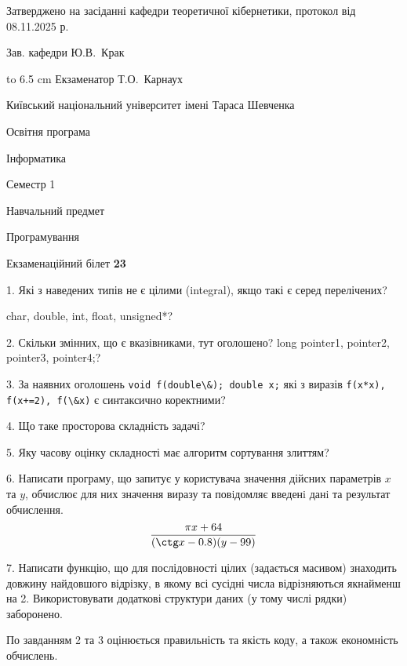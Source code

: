 \documentclass[12pt, ukrainian]{article}
\def\code#1{\Verb!#1!}
\begin{document}
{\smallskip\smallskip \begin {scriptsize} Затверджено на засіданні кафедри теоретичної кібернетики, протокол   від   08.11.2025 р.\par\smallskip\smallskip\smallskip\smallskip
{\parbox {6.5 cm} {Зав. кафедри \dotfill Ю.В.~Крак}}\hspace {0.7cm} {\hbox to 6.5 cm { Екзаменатор \dotfill Т.О.~Карнаух}} \end{scriptsize}}
\newpage
{{\begin {scriptsize}\par
{ \center  Київський національний університет імені Тараса Шевченка \par}
{\parbox {5 cm}{Освітня програма \hfill}{\parbox {7 cm}{Інформатика\hfill}}\parbox {6 cm}{\hfill Семестр 1}}\par
{\parbox {5 cm} {Навчальний предмет \hfill}\parbox {7 cm}{Програмування \hfill}\parbox {6cm}{\hfill}\par}\vspace{-15pt} \end{scriptsize}}{\center Екзаменаційний білет \No \textbf { 23 }\par}}
{%
1. Які з наведених типів не є цілими (integral), якщо такі є серед перелічених?

char, double, int, float, unsigned*?
\par
\vspace{2mm}
2. Скільки змінних, що є вказівниками, тут оголошено?
long pointer1, pointer2, pointer3, pointer4;?
\par
\vspace{2mm}
3. За наявних оголошень \code{void f(double\&); double x;} які з виразів \code{f(x*x), f(x+=2), f(\&x)} є синтаксично коректними?
\par
\vspace{2mm}
4. Що таке просторова складність задачі?
\par
\vspace{2mm}
5. Яку часову оцінку складності має алгоритм сортування злиттям?
\par
\vspace{2mm}
6. Написати програму, що запитує у користувача значення дійсних параметрів $x$ та $y$, обчислює для них значення виразу та повiдомляє введенi данi та результат обчислення.
$$\frac{\pi x + 64}{(\ctg x - 0.8) (y - 99)}$$ 

\par
7. Написати функцію, що для послідовності цілих (задається масивом) знаходить довжину найдовшого відрізку, в якому всі сусідні числа відрізняються якнайменш на 2. Використовувати додаткові структури даних (у тому числі рядки) заборонено.

По завданням 2 та 3 оцінюється правильність та якість коду, а також економність обчислень.

}
\end{document}
